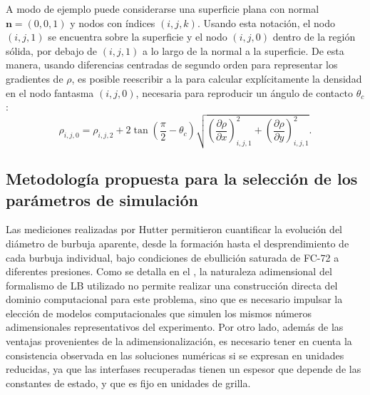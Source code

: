 A modo de ejemplo puede considerarse una superficie plana con normal $\bm{n} = (0,0,1)$ y nodos con \'indices $(i,j,k)$. Usando esta notaci\'on, el nodo $(i,j,1)$ se encuentra sobre la superficie y el nodo $(i,j,0)$ dentro de la regi\'on s\'olida, por debajo de $(i,j,1)$ a lo largo de la normal a la superficie. De esta manera, usando diferencias centradas de segundo orden para representar los gradientes de $\rho$, es posible reescribir a la  para calcular expl\'icitamente la densidad en el nodo fantasma $(i,j,0)$, necesaria para reproducir un \'angulo de contacto $\theta_c$:
\begin{equation}
	\rho_{i,j,0} = \rho_{i,j,2} + 2 \tan \left( \dfrac{\pi}{2} - \theta_c \right) \sqrt{\left( \dfrac{\partial \rho}{\partial x} \right)_{i,j,1}^2 + \left( \dfrac{\partial \rho}{\partial y} \right)_{i,j,1}^2}  .
\end{equation}





\subsection{Metodolog\'ia propuesta para la selecci\'on de los par\'ametros de simulaci\'on}
\label{sec:param_sim_fc72}

Las mediciones realizadas por Hutter permitieron cuantificar la evoluci\'on del di\'ametro de burbuja aparente, desde la formaci\'on hasta el desprendimiento de cada burbuja individual, bajo condiciones de ebullici\'on saturada de FC-72 a diferentes presiones. Como se detalla en el , la naturaleza adimensional del formalismo de LB utilizado no permite realizar una construcci\'on directa del dominio computacional para este problema, sino que es necesario impulsar la elecci\'on de modelos computacionales que simulen los mismos n\'umeros adimensionales representativos del experimento. Por otro lado, adem\'as de las ventajas provenientes de la adimensionalizaci\'on, es necesario tener en cuenta la consistencia observada en las soluciones num\'ericas si se expresan en unidades reducidas, ya que las interfases recuperadas tienen un espesor que depende de las constantes de estado, y que es fijo en unidades de grilla.

